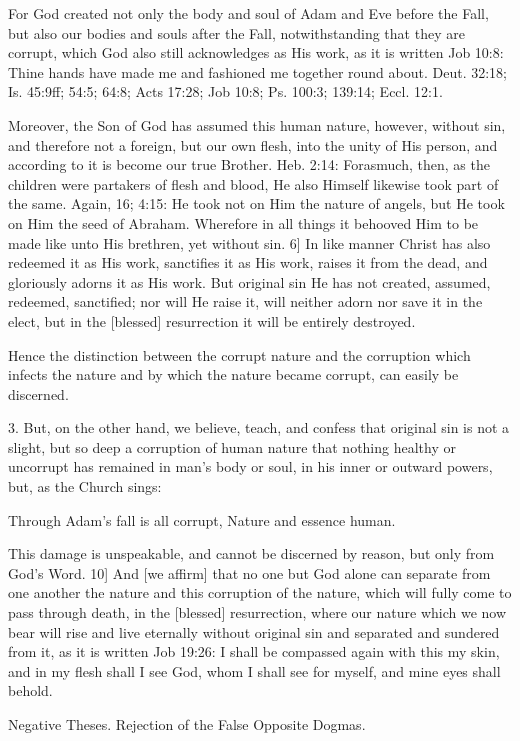 For God created not only the body and soul of Adam and Eve before the Fall, but also our bodies and souls after the Fall, notwithstanding that they are corrupt, which God also still acknowledges as His work, as it is written Job 10:8: Thine hands have made me and fashioned me together round about. Deut. 32:18; Is. 45:9ff; 54:5; 64:8; Acts 17:28; Job 10:8; Ps. 100:3; 139:14; Eccl. 12:1.

Moreover, the Son of God has assumed this human nature, however, without sin, and therefore not a foreign, but our own flesh, into the unity of His person, and according to it is become our true Brother. Heb. 2:14: Forasmuch, then, as the children were partakers of flesh and blood, He also Himself likewise took part of the same. Again, 16; 4:15: He took not on Him the nature of angels, but He took on Him the seed of Abraham. Wherefore in all things it behooved Him to be made like unto His brethren, yet without sin. 6] In like manner Christ has also redeemed it as His work, sanctifies it as His work, raises it from the dead, and gloriously adorns it as His work. But original sin He has not created, assumed, redeemed, sanctified; nor will He raise it, will neither adorn nor save it in the elect, but in the [blessed] resurrection it will be entirely destroyed.

Hence the distinction between the corrupt nature and the corruption which infects the nature and by which the nature became corrupt, can easily be discerned.

3. But, on the other hand, we believe, teach, and confess that original sin is not a slight, but so deep a corruption of human nature that nothing healthy or uncorrupt has remained in man's body or soul, in his inner or outward powers, but, as the Church sings:

Through Adam's fall is all corrupt,
Nature and essence human.

This damage is unspeakable, and cannot be discerned by reason, but only from God's Word. 10] And [we affirm] that no one but God alone can separate from one another the nature and this corruption of the nature, which will fully come to pass through death, in the [blessed] resurrection, where our nature which we now bear will rise and live eternally without original sin and separated and sundered from it, as it is written Job 19:26: I shall be compassed again with this my skin, and in my flesh shall I see God, whom I shall see for myself, and mine eyes shall behold.

Negative Theses.
Rejection of the False Opposite Dogmas.

